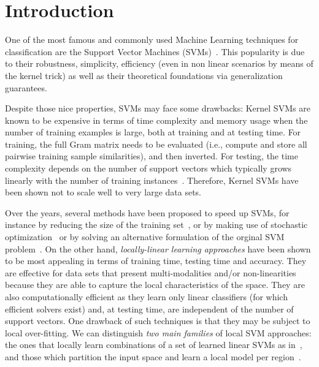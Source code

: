 \section{Introduction}

One of the most famous and commonly used Machine Learning techniques for classification are the Support Vector Machines (SVMs)~\cite{cortes1995support}. This popularity is due to their robustness, simplicity, efficiency (even in non linear scenarios by means of the kernel trick) as well as their theoretical foundations via generalization guarantees. %

Despite those nice properties, SVMs may face some drawbacks: Kernel SVMs are known to be expensive in terms of time complexity and memory usage when the number of training examples is large, both at training and at testing time.
For training, the full Gram matrix needs to be evaluated (i.e., compute and store all pairwise training sample similarities), and then inverted. %
For testing, the time complexity depends on the number of support vectors which typically grows linearly with the number of training instances~\cite{steinwart2003sparseness}.
Therefore, Kernel SVMs have been shown not to scale well to very large data sets. 

Over the years, several methods have been proposed to speed up SVMs, for instance by reducing the size of the training set~\cite{bakir2005breaking}, or by making use of stochastic optimization~\cite{bordes2009sgd} or by solving an alternative formulation of the orginal SVM problem~\cite{Joachims:2006}.
On the other hand, \textit{locally-linear learning approaches} have been shown to be most appealing in terms of training time, testing time and accuracy.
They are effective for data sets that present multi-modalities and/or non-linearities because they are able to capture the local characteristics of the space.
They are also computationally efficient as they learn only linear classifiers (for which efficient solvers exist) and, at testing time, are independent of the number of support vectors.
One drawback of such techniques is that they may be subject to local over-fitting. %
We can distinguish \textit{two main families} of local SVM approaches: the ones that locally learn combinations of a set of learned linear SVMs as in~\cite{ladicky2011locally,fornoni2013multiclass}, and those which partition the input space and learn a local model per region~\cite{gu2013clustered,fu2010mixing}.

